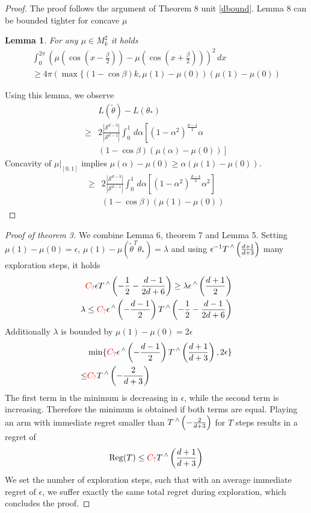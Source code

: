 \documentclass[twoside]{article} \usepackage{aistats2017}
\DeclareMathOperator\caret{\raisebox{1ex}{$\scriptstyle\wedge$}}
\newcommand{\Reg} {
  \operatorname{Reg}}
\newtheorem{lemma}[theorem]{Lemma}
\newcommand{\uc}{
\color{red}C_?\color{black}
}
\begin{document}
\begin{proof}
The proof follows the argument of Theorem 8 unit \ref{dbound}. Lemma 8 can be bounded tighter for concave $\mu$
\begin{lemma}\label{concavebound}
    For any $\mu\in M_k^2$ it holds
\begin{align*}
            \int_{0}^{2\pi}\left(\mu(\cos(x-\frac{\beta}{2}))-\mu( \cos(x+\frac{\beta}{2}))\right)^2\, dx\\
            \geq 4\pi(\max\{(1-\cos{\beta})k,\mu(1)-\mu(0))(\mu(1)-\mu(0))
\end{align*}
\end{lemma}
Using this lemma, we observe
\begin{align*}
    &L(\tilde{\theta})-L(\theta_*)\\
    \geq&2\frac{|\mathcal{S}^{d-3}|}{|\mathcal{S}^{d-1}|}\int_{0}^{1}\,d\alpha\left[(1-\alpha^2)^{\frac{d-4}{2}}\alpha\right.\\
    &\left.(1-\cos{\beta})(\mu(\alpha)-\mu(0))\right]
\end{align*}
Concavity of $\mu|_{[0,1]}$ implies $\mu(\alpha)-\mu(0)\geq \alpha(\mu(1)-\mu(0))$.
\begin{align*}
    \geq&2\frac{|\mathcal{S}^{d-3}|}{|\mathcal{S}^{d-1}|}\int_{0}^{1}\,d\alpha\left[(1-\alpha^2)^{\frac{d-4}{2}}\alpha^{2}\right]\\
    &(1-\cos{\beta})(\mu(1)-\mu(0))
\end{align*}
\end{proof}
\begin{proof}[Proof of theorem 3]
 We combine Lemma 6, theorem 7 and Lemma 5. Setting $\mu(1)-\mu(0)=\epsilon$, $\mu(1)-\mu(\tilde{\theta}^T\theta_*)=\lambda$ and using $\epsilon^{-1}T\caret\left(\frac{d+1}{d+3}\right)$ many exploration steps, it holds
 \begin{align*}
     \uc\epsilon T\caret\left(-\frac{1}{2}-\frac{d-1}{2d+6}\right)  \geq \lambda \epsilon\caret\left(\frac{d+1}{2}\right)\\
     \lambda \leq \uc \epsilon\caret\left(-\frac{d-1}{2}\right)T\caret\left(-\frac{1}{2}-\frac{d-1}{2d+6}\right)\\
 \end{align*}
 Additionally $\lambda$ is bounded by $\mu(1)-\mu(0)=2\epsilon$
 \begin{align*}
 &\min\{\uc \epsilon\caret\left(-\frac{d-1}{2}\right)T\caret\left(\frac{d+1}{d+3}\right),2\epsilon\}\\
 \leq&\uc T\caret\left(-\frac{2}{d+3}\right) 
 \end{align*}
 The first term in the minimum is decreasing in $\epsilon$, while the second term is increasing. Therefore the minimum is obtained if both terms are equal. Playing an arm with immediate regret smaller than $T\caret\left(-\frac{2}{d+3}\right) $ for $T$ steps results in a regret of
 $$\Reg(T) \leq \uc T\caret\left(\frac{d+1}{d+3}\right)$$
We set the number of exploration steps, such that with an average immediate regret of $\epsilon$, we suffer exactly the same total regret during exploration, which concludes the proof.
\end{proof}
\end{document}
